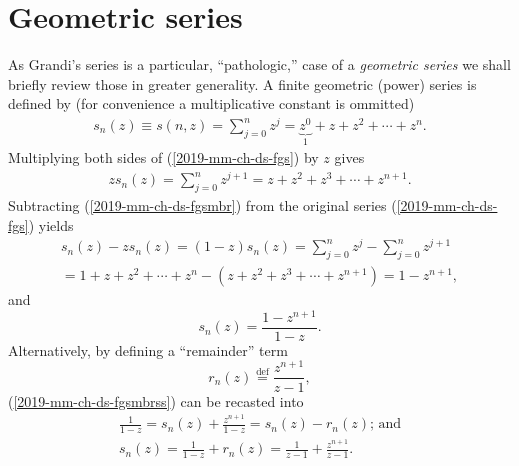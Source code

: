 \section{Geometric series}

As Grandi's series is a particular, ``pathologic,'' case of a {\em geometric series}
we shall briefly review those in greater generality.
A finite geometric (power) series is defined by
(for convenience a multiplicative constant is ommitted)
\begin{equation}
\begin{split}
s_n(z)\equiv s(n,z) =
\sum_{j=0}^n z^j
=\underbrace{z^0}_{1}+z+z^2+  \cdots + z^n
.
\end{split}
\label{2019-mm-ch-ds-fgs}
\end{equation}
Multiplying both sides of
(\ref{2019-mm-ch-ds-fgs})
by $z$ gives
\begin{equation}
\begin{split}
z s_n(z)
= \sum_{j=0}^n z^{j+1}
=z+z^2+z^3+  \cdots + z^{n+1}
.
\end{split}
\label{2019-mm-ch-ds-fgsmbr}
\end{equation}
Subtracting
(\ref{2019-mm-ch-ds-fgsmbr})
from the original series
(\ref{2019-mm-ch-ds-fgs})
yields
\begin{equation}
\begin{split}
s_n(z) - z s_n(z)
= (1 - z)s_n(z)
= \sum_{j=0}^n z^{j} - \sum_{j=0}^n z^{j+1} \\
=
1+z+z^2+  \cdots + z^n
-
\left(z+z^2+z^3+  \cdots + z^{n+1}\right)
=1-z^{n+1},
\end{split}
\label{2019-mm-ch-ds-fgsmbrs}
\end{equation}
and
\begin{equation}
s_n(z)=  \frac{1-z^{n+1}}{1 - z}.
\label{2019-mm-ch-ds-fgsmbrss}
\end{equation}
Alternatively, by defining a ``remainder'' term
\begin{equation}
r_n(z)\stackrel{\text{def}}{=} \frac{z^{n+1}}{z-1},
\label{2019-fiftyfifty-1sgs-remainder}
\end{equation}
(\ref{2019-mm-ch-ds-fgsmbrss})
can be recasted into
\begin{equation}
\begin{split}
\frac{1}{1 - z}= s_n(z)+  \frac{z^{n+1}}{1 - z} = s_n(z) - r_n(z)\text{; and} \\
s_n(z) = \frac{1}{1-z} + r_n(z) = \frac{1}{z - 1} + \frac{z^{n+1}}{z-1}
.
\end{split}
\label{2019-mm-ch-ds-fgsmbrss1}
\end{equation}
